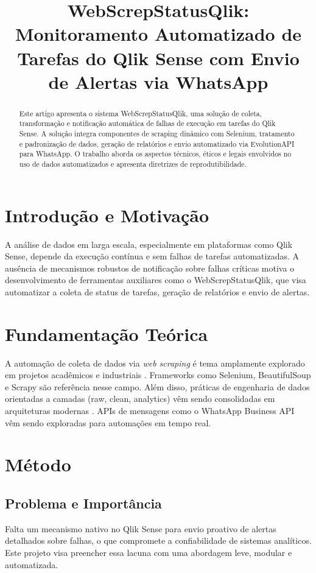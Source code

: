\documentclass[conference]{IEEEtran}
\title{WebScrepStatusQlik: Monitoramento Automatizado de Tarefas do Qlik Sense com Envio de Alertas via WhatsApp}
\author{\IEEEauthorblockN{Wagner Filho}
\IEEEauthorblockA{Instituto de Pós-Graduação \\ Universidade Federal de Goiás \\ wagner.filho@example.com}}
\begin{document}
\maketitle

\begin{abstract}
Este artigo apresenta o sistema WebScrepStatusQlik, uma solução de coleta, transformação e notificação automática de falhas de execução em tarefas do Qlik Sense. A solução integra componentes de scraping dinâmico com Selenium, tratamento e padronização de dados, geração de relatórios e envio automatizado via EvolutionAPI para WhatsApp. O trabalho aborda os aspectos técnicos, éticos e legais envolvidos no uso de dados automatizados e apresenta diretrizes de reprodutibilidade.
\end{abstract}

\section{Introdução e Motivação}
A análise de dados em larga escala, especialmente em plataformas como Qlik Sense, depende da execução contínua e sem falhas de tarefas automatizadas. A ausência de mecanismos robustos de notificação sobre falhas críticas motiva o desenvolvimento de ferramentas auxiliares como o WebScrepStatusQlik, que visa automatizar a coleta de status de tarefas, geração de relatórios e envio de alertas.

\section{Fundamentação Teórica}
A automação de coleta de dados via \textit{web scraping} é tema amplamente explorado em projetos acadêmicos e industriais \cite{mitchell2018web}. Frameworks como Selenium, BeautifulSoup e Scrapy são referência nesse campo. Além disso, práticas de engenharia de dados orientadas a camadas (raw, clean, analytics) vêm sendo consolidadas em arquiteturas modernas \cite{bonomi2015data}. APIs de mensagens como o WhatsApp Business API vêm sendo exploradas para automações em tempo real.

\section{Método}
\subsection{Problema e Importância}
Falta um mecanismo nativo no Qlik Sense para envio proativo de alertas detalhados sobre falhas, o que compromete a confiabilidade de sistemas analíticos. Este projeto visa preencher essa lacuna com uma abordagem leve, modular e automatizada.
\end{document}
